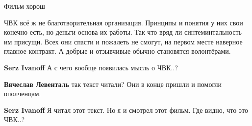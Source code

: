\begin{itemize}
 
Фильм хорош

 

ЧВК всё ж не благотворительная организация. Принципы и понятия у них свои
конечно есть, но деньги основа их работы. Так что вряд ли синтеминтальность им
присущи. Всех они спасти и пожалеть не смогут, на первом месте наверное главное
контракт. А добрые и отзывчивые обычно становятся волонтёрами.

\begin{itemize}
 
\textbf{Serz Ivanoff} А с чего вообще появилась мысль о ЧВК..?

 
\textbf{Вячеслав Левенталь} так текст читали? Они в конце пришли и помогли ополченцам.

 
\textbf{Serz Ivanoff} Я читал этот текст. Но я и смотрел этот фильм. Где видно, что это ЧВК..?

 

\end{itemize}
\end{itemize}
